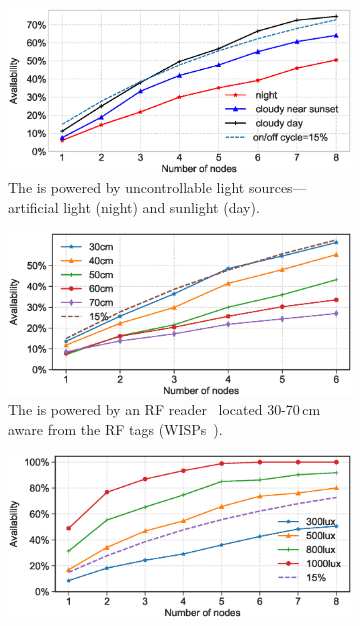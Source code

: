 \begin{figure}[h]
        \begin{subfigure}{.66\columnwidth}
            \includegraphics[width=\textwidth]{figures/sysAvailability}
                \caption{The \sys is powered by uncontrollable light sources---artificial light (night) and sunlight (day).}
            \label{fig:solarPwrCIS}
        \end{subfigure}\hfill
        \begin{subfigure}{.66\columnwidth}
            \includegraphics[width=\textwidth]{figures/rf_sysAvailability}
                \caption{The \sys is powered by an RF reader~\cite{r420_website} located 30-70\,cm aware from the RF tags (WISPs~\cite{smith_ubicomp_2006}).}
            \label{fig:rfPwrCIS}
        \end{subfigure}\hfill
        \begin{subfigure}{.66\columnwidth}
            \includegraphics[width=\textwidth]{figures/sysAvailability_artificial-light}

\end{subfigure}
\end{figure}

